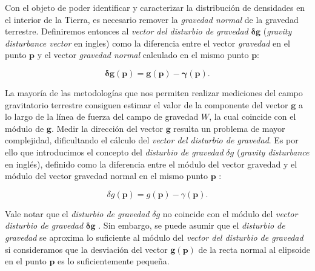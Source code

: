 Con el objeto de poder identificar y caracterizar la distribución de densidades
en el interior de la Tierra, es necesario remover la \emph{gravedad normal} de
la gravedad terrestre.
Definiremos entonces al \emph{vector del disturbio de gravedad}
$\boldsymbol\delta \mathbf{g}$ (\emph{gravity disturbance vector} en ingles)
como la diferencia entre el vector \emph{gravedad} en el punto $\mathbf{p}$
y el vector \emph{gravedad normal} calculado en el mismo punto $\mathbf{p}$:

\begin{equation}
    \boldsymbol\delta \mathbf{g}(\mathbf{p}) =
        \mathbf{g}(\mathbf{p}) - \boldsymbol\gamma(\mathbf{p}).
    \label{eq:gravity-disturbance-vector}
\end{equation}

La mayoría de las metodologías que nos permiten realizar mediciones del campo
gravitatorio terrestre consiguen estimar el valor de la componente del vector
$\mathbf{g}$ a lo largo de la línea de fuerza del campo de gravedad $W$, la
cual coincide con el módulo de $\mathbf{g}$.
Medir la dirección del vector $\mathbf{g}$ resulta un problema de mayor
complejidad, dificultando el cálculo del \emph{vector del disturbio de
gravedad}.
Es por ello que introducimos el concepto del \emph{disturbio de gravedad}
$\delta g$ (\emph{gravity disturbance} en inglés), definido como la diferencia
entre el módulo del vector gravedad y el módulo del vector gravedad normal en
el mismo punto $\mathbf{p}$
\citep{heiskanen1967,hofmannwellenhof2005,oliveira2018}:

\begin{equation}
    \delta g(\mathbf{p}) =
        g(\mathbf{p}) - \gamma(\mathbf{p}).
    \label{eq:gravity-disturbance}
\end{equation}

Vale notar que el \emph{disturbio de gravedad} $\delta g$ no coincide con el
módulo del \emph{vector disturbio de gravedad} $\boldsymbol\delta \mathbf{g}$
\citep{barthelmes2013,sanso2013,oliveira2018}.
Sin embargo, se puede asumir que el \emph{disturbio de gravedad} se aproxima lo
suficiente al módulo del \emph{vector del disturbio de gravedad} si
consideramos que la desviación del vector $\mathbf{g}(\mathbf{p})$ de la recta
normal al elipsoide en el punto $\mathbf{p}$ es lo suficientemente pequeña.

